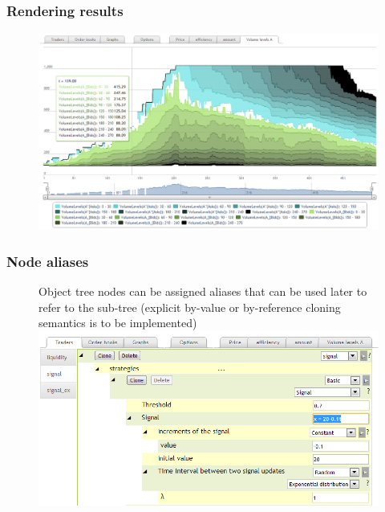 \documentclass{beamer}
\begin{document}
\begin{frame}
\frametitle{Rendering results}
\begin{figure}[htbp]
\centering
\includegraphics[width=1\linewidth]{js-graph.png}
\end{figure}
\end{frame}

\begin{frame}
\frametitle{Node aliases}
\begin{figure}[htbp]
Object tree nodes can be assigned aliases that can be used later to refer to the sub-tree (explicit by-value or by-reference cloning semantics is to be implemented)
\centering
\includegraphics[width=1\linewidth]{js-alias.png}
\end{figure}
\end{frame}
\end{document}
